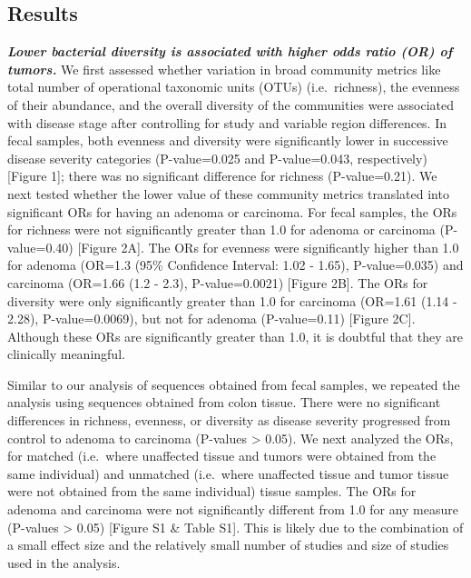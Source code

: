 \documentclass[12pt,]{article}
\begin{document}
\newpage

\subsection{Results}\label{results}

\textbf{\emph{Lower bacterial diversity is associated with higher odds
ratio (OR) of tumors.}} We first assessed whether variation in broad
community metrics like total number of operational taxonomic units
(OTUs) (i.e.~richness), the evenness of their abundance, and the overall
diversity of the communities were associated with disease stage after
controlling for study and variable region differences. In fecal samples,
both evenness and diversity were significantly lower in successive
disease severity categories (P-value=0.025 and P-value=0.043,
respectively) {[}Figure 1{]}; there was no significant difference for
richness (P-value=0.21). We next tested whether the lower value of these
community metrics translated into significant ORs for having an adenoma
or carcinoma. For fecal samples, the ORs for richness were not
significantly greater than 1.0 for adenoma or carcinoma (P-value=0.40)
{[}Figure 2A{]}. The ORs for evenness were significantly higher than 1.0
for adenoma (OR=1.3 (95\% Confidence Interval: 1.02 - 1.65),
P-value=0.035) and carcinoma (OR=1.66 (1.2 - 2.3), P-value=0.0021)
{[}Figure 2B{]}. The ORs for diversity were only significantly greater
than 1.0 for carcinoma (OR=1.61 (1.14 - 2.28), P-value=0.0069), but not
for adenoma (P-value=0.11) {[}Figure 2C{]}. Although these ORs are
significantly greater than 1.0, it is doubtful that they are clinically
meaningful.

Similar to our analysis of sequences obtained from fecal samples, we
repeated the analysis using sequences obtained from colon tissue. There
were no significant differences in richness, evenness, or diversity as
disease severity progressed from control to adenoma to carcinoma
(P-values \textgreater{} 0.05). We next analyzed the ORs, for matched
(i.e.~where unaffected tissue and tumors were obtained from the same
individual) and unmatched (i.e.~where unaffected tissue and tumor tissue
were not obtained from the same individual) tissue samples. The ORs for
adenoma and carcinoma were not significantly different from 1.0 for any
measure (P-values \textgreater{} 0.05) {[}Figure S1 \& Table S1{]}. This
is likely due to the combination of a small effect size and the
relatively small number of studies and size of studies used in the
analysis.
\end{document}

